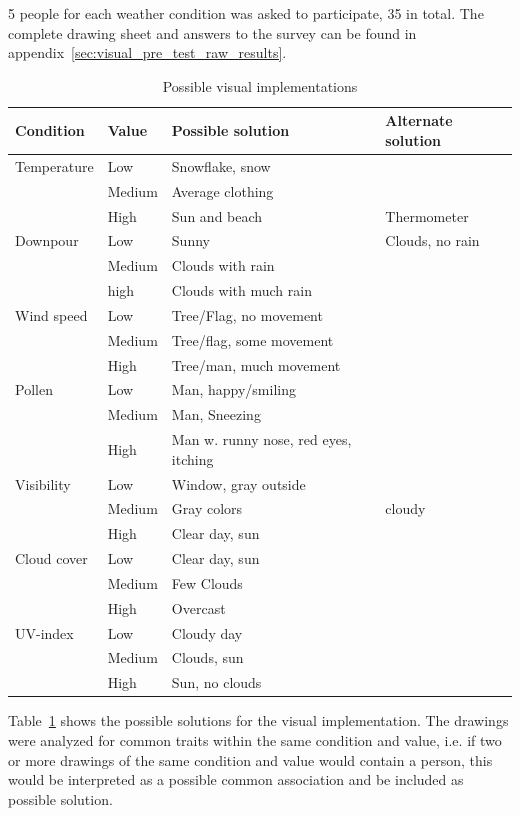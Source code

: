 5 people for each weather condition was asked to participate, 35 in total. 
The complete drawing sheet and answers to the survey can be found in appendix~\ref{sec:visual_pre_test_raw_results}.

\begin{table}[!htbp]
    \centering
    \begin{tabular}{l | l | l | l}
    Condition & Value & Possible solution & Alternate solution \\
    \hline \hline
    Temperature & Low & Snowflake, snow &  \\
    & Medium & Average clothing \\
    & High & Sun and beach & Thermometer \\
    \hline
    Downpour & Low & Sunny & Clouds, no rain \\
    & Medium & Clouds with rain & \\
    & high & Clouds with much rain & \\
    \hline
    Wind speed & Low & Tree/Flag, no movement & \\
    & Medium & Tree/flag, some movement & \\
    & High & Tree/man, much movement & \\
    \hline
    Pollen & Low & Man, happy/smiling & \\
    & Medium & Man, Sneezing & \\
    & High & Man w. runny nose, red eyes, itching & \\
    \hline
    Visibility & Low & Window, gray outside & \\
    & Medium & Gray colors & cloudy \\
    & High & Clear day, sun & \\
    \hline
    Cloud cover & Low & Clear day, sun & \\
    & Medium & Few Clouds & \\
    & High & Overcast & \\
    \hline
    UV-index & Low & Cloudy day & \\
    & Medium & Clouds, sun & \\
    & High & Sun, no clouds & \\
    \end{tabular}
    \caption{Possible visual implementations}
    \label{tab:visual_pre_test}
\end{table}

Table~\ref{tab:visual_pre_test} shows the possible solutions for the visual implementation.
The drawings were analyzed for common traits within the same condition and value, i.e. if two or more drawings of the same condition and value would contain a person, this would be interpreted as a possible common association and be included as possible solution.

